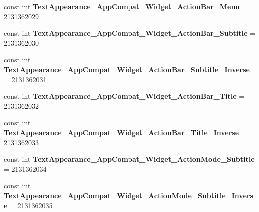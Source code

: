 \begin{DoxyCompactItemize}
\item 
\mbox{\label{class_pinned_app_1_1_droid_1_1_resource_1_1_style_a5ecf13cd083b3093a6f7adf74f34d6f0}} 
const int {\bfseries Text\+Appearance\+\_\+\+App\+Compat\+\_\+\+Widget\+\_\+\+Action\+Bar\+\_\+\+Menu} = 2131362029
\item 
\mbox{\label{class_pinned_app_1_1_droid_1_1_resource_1_1_style_a508cf21eba0bb75eb870e2e0595a9216}} 
const int {\bfseries Text\+Appearance\+\_\+\+App\+Compat\+\_\+\+Widget\+\_\+\+Action\+Bar\+\_\+\+Subtitle} = 2131362030
\item 
\mbox{\label{class_pinned_app_1_1_droid_1_1_resource_1_1_style_a1a9a310502349c64effa3c0702b698b6}} 
const int {\bfseries Text\+Appearance\+\_\+\+App\+Compat\+\_\+\+Widget\+\_\+\+Action\+Bar\+\_\+\+Subtitle\+\_\+\+Inverse} = 2131362031
\item 
\mbox{\label{class_pinned_app_1_1_droid_1_1_resource_1_1_style_af39690aa280cb105d5a37ea7dbc1c3a3}} 
const int {\bfseries Text\+Appearance\+\_\+\+App\+Compat\+\_\+\+Widget\+\_\+\+Action\+Bar\+\_\+\+Title} = 2131362032
\item 
\mbox{\label{class_pinned_app_1_1_droid_1_1_resource_1_1_style_a997fe743a15be85012137e281c0c1e34}} 
const int {\bfseries Text\+Appearance\+\_\+\+App\+Compat\+\_\+\+Widget\+\_\+\+Action\+Bar\+\_\+\+Title\+\_\+\+Inverse} = 2131362033
\item 
\mbox{\label{class_pinned_app_1_1_droid_1_1_resource_1_1_style_adfa119dd0e576b4fb8d6960076cb7741}} 
const int {\bfseries Text\+Appearance\+\_\+\+App\+Compat\+\_\+\+Widget\+\_\+\+Action\+Mode\+\_\+\+Subtitle} = 2131362034
\item 
\mbox{\label{class_pinned_app_1_1_droid_1_1_resource_1_1_style_a4e3274a75aaefd01f1f240398d937aae}} 
const int {\bfseries Text\+Appearance\+\_\+\+App\+Compat\+\_\+\+Widget\+\_\+\+Action\+Mode\+\_\+\+Subtitle\+\_\+\+Inverse} = 2131362035
\item 

\end{DoxyCompactItemize}
